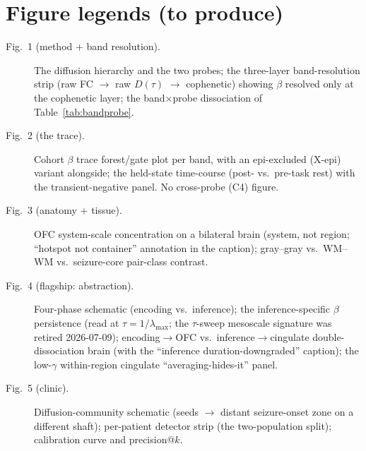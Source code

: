 \documentclass[11pt]{article}
\newcommand{\tab}[1]{Table~\ref{#1}}
\begin{document}
\section*{Figure legends (to produce)}
\begin{description}
\item[Fig.~1 (method + band resolution).] The diffusion hierarchy and the two
  probes; the three-layer band-resolution strip (raw FC $\rightarrow$ raw
  $D(\tau)$ $\rightarrow$ cophenetic) showing $\beta$ resolved only at the
  cophenetic layer; the band$\times$probe dissociation of \tab{tab:bandprobe}.
\item[Fig.~2 (the trace).] Cohort $\beta$ trace forest/gate plot per band, with an
  epi-excluded (X-epi) variant alongside; the held-state time-course
  (post- vs.\ pre-task rest) with the transient-negative panel. No cross-probe
  (C4) figure.
\item[Fig.~3 (anatomy + tissue).] OFC system-scale concentration on a bilateral
  brain (system, not region; ``hotspot not container'' annotation in the caption);
  gray--gray vs.\ WM--WM vs.\ seizure-core pair-class contrast.
\item[Fig.~4 (flagship: abstraction).] Four-phase schematic (encoding vs.\
  inference); the inference-specific $\beta$ persistence
  (read at $\tau=1/\lambda_{\max}$; the $\tau$-sweep mesoscale signature was retired
  2026-07-09); encoding$\rightarrow$OFC vs.\ inference$\rightarrow$cingulate
  double-dissociation brain (with the ``inference duration-downgraded'' caption);
  the low-$\gamma$ within-region cingulate ``averaging-hides-it'' panel.
\item[Fig.~5 (clinic).] Diffusion-community schematic (seeds $\rightarrow$ distant
  seizure-onset zone on a different shaft); per-patient detector strip (the
  two-population split); calibration curve and precision@$k$.
\end{description}
\end{document}
